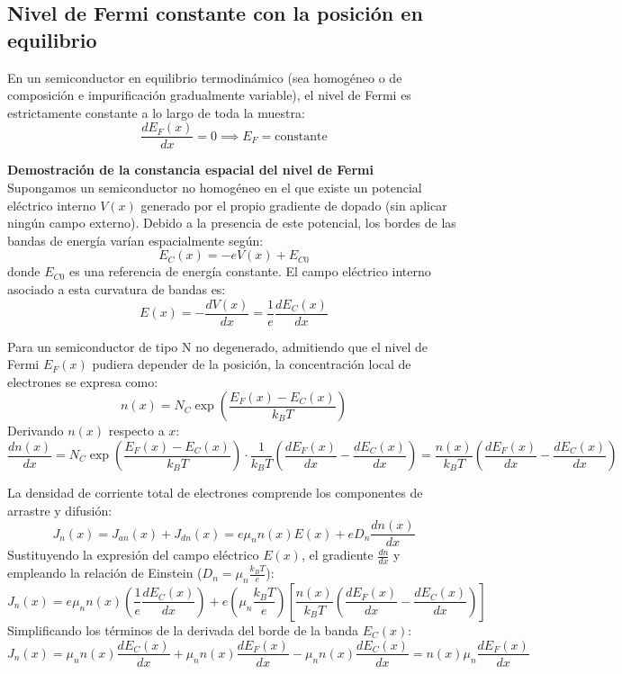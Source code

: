 \newpage
\phantom{a}

\newpage
\subsection{Nivel de Fermi constante con la posición en equilibrio}

En un semiconductor en equilibrio termodinámico (sea homogéneo o de composición e impurificación gradualmente variable), el nivel de Fermi es estrictamente constante a lo largo de toda la muestra:
\[
\frac{dE_F(x)}{dx} = 0 \implies E_F = \text{constante}
\]

\textbf{Demostración de la constancia espacial del nivel de Fermi}\\
Supongamos un semiconductor no homogéneo en el que existe un potencial eléctrico interno $V(x)$ generado por el propio gradiente de dopado (sin aplicar ningún campo externo). Debido a la presencia de este potencial, los bordes de las bandas de energía varían espacialmente según:
\[
E_C(x) = -e V(x) + E_{C0}
\]
donde $E_{C0}$ es una referencia de energía constante. El campo eléctrico interno asociado a esta curvatura de bandas es:
\[
E(x) = -\frac{dV(x)}{dx} = \frac{1}{e} \frac{dE_C(x)}{dx}
\]

Para un semiconductor de tipo N no degenerado, admitiendo que el nivel de Fermi $E_F(x)$ pudiera depender de la posición, la concentración local de electrones se expresa como:
\[
n(x) = N_C \exp\left( \frac{E_F(x) - E_C(x)}{k_B T} \right)
\]
Derivando $n(x)$ respecto a $x$:
\[
\frac{dn(x)}{dx} = N_C \exp\left( \frac{E_F(x) - E_C(x)}{k_B T} \right) \cdot \frac{1}{k_B T} \left( \frac{dE_F(x)}{dx} - \frac{dE_C(x)}{dx} \right) = \frac{n(x)}{k_B T} \left( \frac{dE_F(x)}{dx} - \frac{dE_C(x)}{dx} \right)
\]

La densidad de corriente total de electrones comprende los componentes de arrastre y difusión:
\[
J_n(x) = J_{an}(x) + J_{dn}(x) = e \mu_n n(x) E(x) + e D_n \frac{dn(x)}{dx}
\]
Sustituyendo la expresión del campo eléctrico $E(x)$, el gradiente $\frac{dn}{dx}$ y empleando la relación de Einstein ($D_n = \mu_n \frac{k_B T}{e}$):
\[
J_n(x) = e \mu_n n(x) \left( \frac{1}{e} \frac{dE_C(x)}{dx} \right) + e \left( \mu_n \frac{k_B T}{e} \right) \left[ \frac{n(x)}{k_B T} \left( \frac{dE_F(x)}{dx} - \frac{dE_C(x)}{dx} \right) \right]
\]
Simplificando los términos de la derivada del borde de la banda $E_C(x)$:
\[
J_n(x) = \mu_n n(x) \frac{dE_C(x)}{dx} + \mu_n n(x) \frac{dE_F(x)}{dx} - \mu_n n(x) \frac{dE_C(x)}{dx} = n(x) \mu_n \frac{dE_F(x)}{dx}
\]

